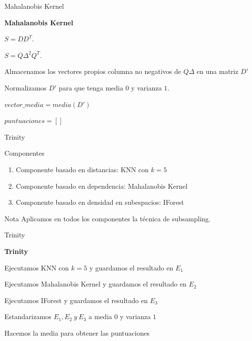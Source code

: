 \documentclass[10pt]{beamer}
\begin{document}
\begin{frame}[fragile]{Mahalanobis Kernel}
\vspace{10px}
\pause
{}

\begin{algorithm}[H]{\textbf{Mahalanobis Kernel}}
	
	$S = DD^T$.
	
	$S = Q\Delta^2 Q^T$.
	
	Almacenamos los vectores propios columna no negativos de $Q\Delta$ en una matriz $D'$
	
	Normalizamos $D'$ para que tenga media $0$ y varianza $1$.
	
	$vector\_media = media(D')$
	
	$puntuaciones = []$
	
\end{algorithm}

\end{frame}

\begin{frame}[fragile]{Trinity}
\vspace{10px}
\pause
{}


\begin{block}{Componentes}
	\begin{enumerate}
		\item Componente basado en distancias: KNN con $k=5$
		\pause
		\item Componente basado en dependencia: Mahalanobis Kernel
		\pause
		\item Componente basado en densidad en subespacios: IForest
	\end{enumerate}
\end{block}

\begin{alertblock}{Nota}
	Aplicamos en todos los componentes la técnica de subsampling.
\end{alertblock}

\end{frame}

\begin{frame}[fragile]{Trinity}
\vspace{10px}
\pause
{}

\begin{algorithm}[H]{\textbf{Trinity}}
	
	Ejecutamos KNN con $k=5$ y guardamos el resultado en $E_1$
	
	Ejecutamos Mahalanobis Kernel y guardamos el resultado en $E_2$
	
	Ejecutamos IForest y guardamos el resultado en $E_3$
	
	Estandarizamos $E_1 , E_2 \ y \ E_3$ a media $0$ y varianza $1$
	
	Hacemos la media para obtener las puntuaciones
	
\end{algorithm}

\end{frame}
\end{document}
